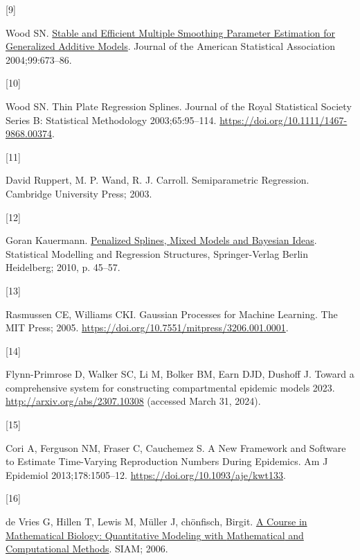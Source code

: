 \documentclass[
11pt, %
oneside, %
english, %
singlespacing, %
]{macthesis} %
\newlength{\cslhangindent}
\newlength{\csllabelwidth}
\newenvironment{CSLReferences}[2] %
{\begin{list}{}{%
	\setlength{\itemindent}{0pt}
	\setlength{\leftmargin}{0pt}
	\setlength{\parsep}{0pt}
	\ifodd #1
	\setlength{\leftmargin}{\cslhangindent}
	\setlength{\itemindent}{-1\cslhangindent}
	\fi
	\setlength{\itemsep}{#2\baselineskip}}}
{\end{list}}
\newcommand{\CSLLeftMargin}[1]{\parbox[t]{\csllabelwidth}{\strut#1\strut}}
\newcommand{\CSLRightInline}[1]{\parbox[t]{\linewidth - \csllabelwidth}{\strut#1\strut}}
\begin{document}
\begin{CSLReferences}{0}{0}
\CSLLeftMargin{{[}9{]} }%
\CSLRightInline{Wood SN. \href{https://www.jstor.org/stable/27590439}{Stable and {Efficient Multiple Smoothing Parameter Estimation} for {Generalized Additive Models}}. Journal of the American Statistical Association 2004;99:673--86.}

\CSLLeftMargin{{[}10{]} }%
\CSLRightInline{Wood SN. Thin {Plate Regression Splines}. Journal of the Royal Statistical Society Series B: Statistical Methodology 2003;65:95--114. \url{https://doi.org/10.1111/1467-9868.00374}.}

\CSLLeftMargin{{[}11{]} }%
\CSLRightInline{David Ruppert, M. P. Wand, R. J. Carroll. Semiparametric {Regression}. Cambridge University Press; 2003.}

\CSLLeftMargin{{[}12{]} }%
\CSLRightInline{Goran Kauermann. \href{https://link-springer-com.libaccess.lib.mcmaster.ca/book/10.1007/978-3-7908-2413-1}{Penalized {Splines}, {Mixed Models} and {Bayesian Ideas}}. Statistical {Modelling} and {Regression Structures}, Springer-Verlag Berlin Heidelberg; 2010, p. 45--57.}

\CSLLeftMargin{{[}13{]} }%
\CSLRightInline{Rasmussen CE, Williams CKI. Gaussian {Processes} for {Machine Learning}. The MIT Press; 2005. \url{https://doi.org/10.7551/mitpress/3206.001.0001}.}

\CSLLeftMargin{{[}14{]} }%
\CSLRightInline{Flynn-Primrose D, Walker SC, Li M, Bolker BM, Earn DJD, Dushoff J. Toward a comprehensive system for constructing compartmental epidemic models 2023. \url{http://arxiv.org/abs/2307.10308} (accessed March 31, 2024).}

\CSLLeftMargin{{[}15{]} }%
\CSLRightInline{Cori A, Ferguson NM, Fraser C, Cauchemez S. A {New Framework} and {Software} to {Estimate Time-Varying Reproduction Numbers During Epidemics}. Am J Epidemiol 2013;178:1505--12. \url{https://doi.org/10.1093/aje/kwt133}.}

\CSLLeftMargin{{[}16{]} }%
\CSLRightInline{de Vries G, Hillen T, Lewis M, Müller J, chönfisch, Birgit. \href{https://books.google.com?id=6bjaAQAAQBAJ}{A {Course} in {Mathematical Biology}: {Quantitative Modeling} with {Mathematical} and {Computational Methods}}. SIAM; 2006.}


\end{CSLReferences}
\end{document}
